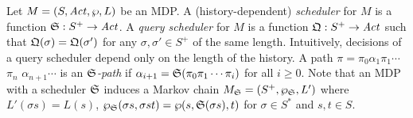 Let $M = (S, \mathit{Act}, \wp, L)$ be an MDP. A (history-dependent)
\emph{scheduler} for $M$ is a function $\mathfrak{S} : S^+
\rightarrow \mathit{Act}$. A \emph{query scheduler} for $M$ is a function
$\mathfrak{Q} : S^+ \rightarrow \mathit{Act}$ such that
$\mathfrak{Q}(\sigma) = \mathfrak{Q}(\sigma')$ for any $\sigma,
\sigma' \in S^+$ of the same length.
Intuitively, decisions of a query scheduler depend only on the length of the history.
A path $\pi =
\pi_0 \alpha_1 \pi_1 \cdots$ $\pi_n$ $\alpha_{n+1} \cdots$ is an
\emph{$\mathfrak{S}$-path} if $\alpha_{i+1} = \mathfrak{S}(\pi_0
\pi_1 \cdots \pi_i)$ for all $i \geq 0$.
Note that an MDP with a
scheduler $\mathfrak{S}$ induces a Markov chain $M_{\mathfrak{S}} =
(S^+, \wp_{\mathfrak{S}}, L')$ where $L' (\sigma s) = L (s)$,
$\wp_{\mathfrak{S}} (\sigma s, \sigma s t) = \wp (s,
\mathfrak{S}(\sigma s), t)$ for $\sigma \in S^*$ and $s, t \in S$.

